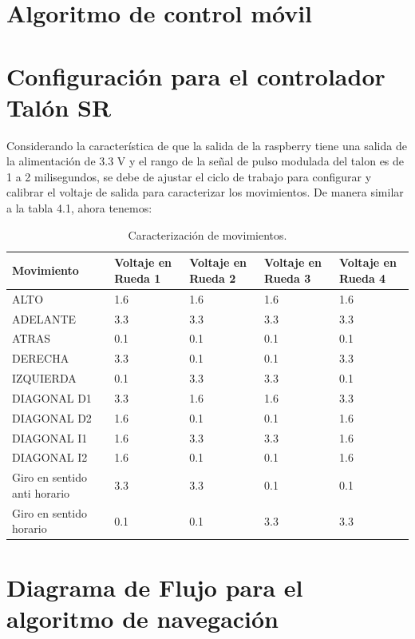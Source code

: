 \documentclass[12pt]{book} %
\begin{document}
\section{Algoritmo de control móvil} %
 \lhead[]{}
\section{Configuración para el controlador Talón SR}
		
Considerando la característica de que la salida de la raspberry tiene una salida de la alimentación de 3.3 V y el rango de la señal de pulso modulada del talon es de 1 a 2 milisegundos, se debe de ajustar el ciclo de trabajo para configurar y calibrar el voltaje de salida para caracterizar los movimientos. De manera similar a la tabla 4.1, ahora tenemos:
\begin{table}[t]
\begin{center}
\begin{tabular}{| p{4cm} | p{3cm} | p{3cm} | p{3cm}  | p{3cm} |} 
	
	\hline
	Movimiento & Voltaje en Rueda 1 & Voltaje en Rueda 2 & Voltaje en Rueda 3 & Voltaje en Rueda 4\\
	\hline
	ALTO & 1.6 & 1.6 & 1.6 & 1.6\\
	\hline
	ADELANTE & 3.3 & 3.3 & 3.3 & 3.3\\
	\hline
	ATRAS & 0.1 & 0.1 & 0.1 & 0.1\\
	\hline
	DERECHA & 3.3 & 0.1 & 0.1 & 3.3\\
	\hline
	IZQUIERDA & 0.1 & 3.3 & 3.3 & 0.1\\
	\hline
	DIAGONAL D1 & 3.3 & 1.6 & 1.6 & 3.3\\
	\hline
	DIAGONAL D2 & 1.6 & 0.1 & 0.1 & 1.6\\
	\hline
	DIAGONAL I1 & 1.6 & 3.3 & 3.3 & 1.6\\
	\hline
	DIAGONAL I2 & 1.6 & 0.1 & 0.1 & 1.6\\
	\hline
Giro en sentido anti horario & 3.3 &3.3 & 0.1 & 0.1\\
	\hline
Giro en sentido horario & 0.1 & 0.1 & 3.3 & 3.3\\
	\hline
\end{tabular}
\caption{Caracterización de movimientos.}
\end{center}
\end{table}
 \section{Diagrama de Flujo para el algoritmo de navegación}
		
\end{document}
